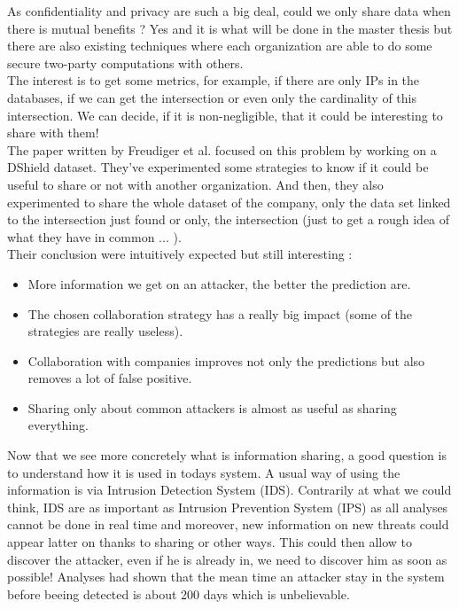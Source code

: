\documentclass{eplmastersthesis}
\begin{document}
As confidentiality and privacy are such a big deal, could we only share data when there is mutual benefits ? Yes and it is what will be done in the master thesis but there are also existing techniques where each organization are able to do some secure two-party computations with others.\\
The interest is to get some metrics, for example, if there are only IPs in the databases, if we can get the intersection or even only the cardinality of this intersection. We can decide, if it is non-negligible, that it could be interesting to share with them!\\
The paper written by Freudiger et al.\cite{freudiger2015controlled} focused on this problem by working on a DShield dataset. They've experimented some strategies to know if it could be useful to share or not with another organization. And then, they also experimented to share the whole dataset of the company, only the data set linked to the intersection just found or only, the intersection (just to get a rough idea of what they have in common ... ).\\
Their conclusion were intuitively expected but still interesting :
\begin{itemize}
\item More information we get on an attacker, the better the prediction are.
\item The chosen collaboration strategy has a really big impact (some of the strategies are really useless).
\item Collaboration with companies improves not only the predictions but also removes a lot of false positive.
\item Sharing only about common attackers is almost as useful as sharing everything.
\end{itemize}


Now that we see more concretely what is information sharing, a good question is to understand how it is used in todays system. A usual way of using the information is via Intrusion Detection System (IDS). Contrarily at what we could think, IDS are as important as Intrusion Prevention System (IPS) as all analyses cannot be done in real time and moreover, new information on new threats could appear latter on thanks to sharing or other ways. This could then allow to discover the attacker, even if he is already in, we need to discover him as soon as possible! Analyses had shown that the mean time an attacker stay in the system before beeing detected is about 200 days which is unbelievable.
\end{document}
